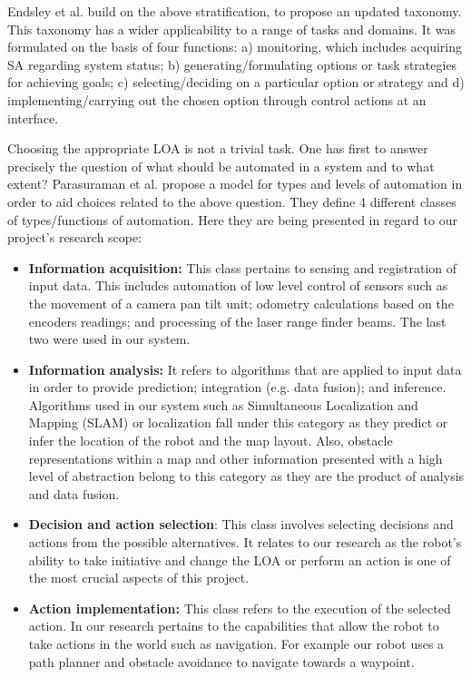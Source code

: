 \documentclass[a4paper,12pt,oneside,openright]{bhamthesis}
\begin{document}
Endsley et al. \cite{Endsley1999} build on the above stratification, to propose an updated taxonomy. This taxonomy has a wider applicability to a range of tasks and domains. It was formulated on the basis of four functions: a) monitoring, which includes acquiring SA regarding system status; b) generating/formulating options or task strategies for achieving goals; c) selecting/deciding on a particular option or strategy and d) implementing/carrying out the chosen option through control actions at an interface.

Choosing the appropriate LOA is not a trivial task. One has first to answer precisely the question of what should be automated in a system and to what extent? Parasuraman et al. \cite{Parasuraman2000} propose a model for types and levels of automation in order to aid choices related to the above question. They define 4 different classes of types/functions of automation. Here they are being presented in regard to our project's research scope:

\begin{itemize}
	\item \textbf{Information acquisition:} This class pertains to sensing and registration of input data. This includes automation of low level control of sensors such as the movement of a camera pan tilt unit; odometry calculations based on the encoders readings; and processing of the laser range finder beams. The last two were used in our system.
	
	\item \textbf{Information analysis:} It refers to algorithms that are applied to input data in order to provide prediction; integration (e.g. data fusion); and inference. Algorithms used in our system such as Simultaneous Localization and Mapping (SLAM) or localization fall under this category as they predict or infer the location of the robot and the map layout. Also, obstacle representations within a map and other information presented with a high level of abstraction belong to this category as they are the product of analysis and data fusion.
	 
	\item \textbf{Decision and action selection}: This class involves selecting decisions and actions from the possible alternatives. It relates to our research as the robot's ability to take initiative and change the LOA or perform an action is one of the most crucial aspects of this project.
	
	\item \textbf{Action implementation:} This class refers to the execution of the selected action. In our research pertains to the capabilities that allow the robot to take actions in the world such as navigation. For example our robot uses a path planner and obstacle avoidance to navigate towards a waypoint.
\end{itemize}
\end{document}
